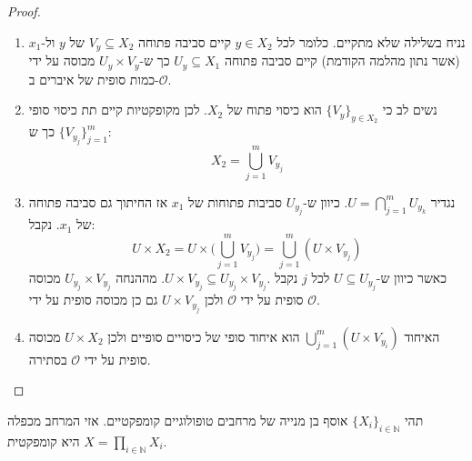 \documentclass{tstextbook}
\begin{document}
\begin{proof}
  \begin{enumerate}
    \item נניח בשלילה שלא מתקיים. כלומר לכל \(y \in X_{2}\) קיים סביבה פתוחה \(V_{y}\subseteq X_{2}\) של \(y\) ול-\(x_{1}\)(אשר נתון מהלמה הקודמת) קיים סביבה פתוחה \(U_{y}\subseteq X_{1}\) כך ש-\(U_{y}\times V_{y}\) מכוסה על ידי כמות סופית של איברים ב-\(\mathcal{O}\). 


    \item נשים לב כי \(\{ V_{y} \}_{y \in X_{2}}\) הוא כיסוי פתוח של \(X_{2}\). לכן מקופקטיות קיים תת כיסוי סופי \(\{ V_{y_{j}} \}_{j=1}^{m}\) כך ש: 
$$X_{2}=\bigcup_{j=1}^{m}V_{y_{j}}$$


    \item נגדיר \(U=\bigcap_{j=1}^{m}U_{y_{k}}\). כיוון ש-\(U_{y_{j}}\) סביבות פתוחות של \(x_{1}\) אז החיתוך גם סביבה פתוחה של \(x_{1}\). נקבל: 
$$U\times X_{2}=U\times \Bigg(\bigcup_{j=1}^{m}V_{y_{j}}\Bigg)=\bigcup_{j=1}^{m}\left( U\times V_{y_{j}} \right)$$
כאשר כיוון ש-\(U\subseteq U_{y_{j}}\) לכל \(j\) נקבל \(U\times V_{y_{j}}\subseteq U_{y_{j}}\times V_{y_{j}}.\). מההנחה \(U_{y_{j}}\times V_{y_{j}}\) מכוסה סופית על ידי \(\mathcal{O}\) ולכן \(U\times V_{y_{j}}\) גם כן מכוסה סופית על ידי \(\mathcal{O}\).


    \item האיחוד \(\bigcup_{j=1}^{m}\left( U\times V_{y_{i}} \right)\) הוא איחוד סופי של כיסויים סופיים ולכן \(U\times X_{2}\) מכוסה סופית על ידי \(\mathcal{ O}\) בסתירה. 


  \end{enumerate}
\end{proof}
\begin{proposition}
תהי \(\{ X_{i} \}_{i \in \mathbb{N}}\) אוסף בן מנייה של מרחבים טופולוגיים קומפקטיים. אזי המרחב מכפלה \(X=\prod_{i\in \mathbb{N}} X_{i}\) היא קומפקטית.

\end{proposition}
\end{document}
